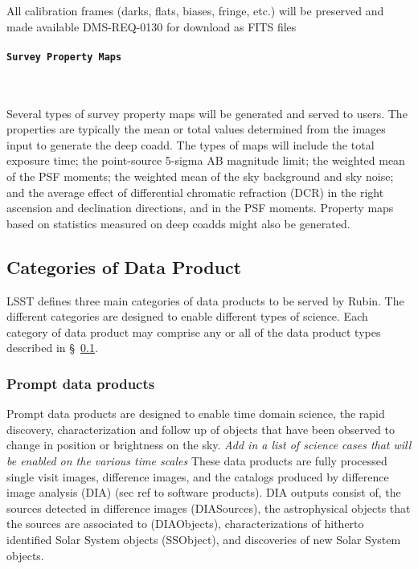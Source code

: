 All calibration frames (darks, flats, biases, fringe, etc.) will be preserved and made available DMS-REQ-0130
for download as FITS files

\paragraph {\tt  Survey Property Maps}~

Several types of survey property maps will be generated and served to users. 
The properties are typically the mean or total values determined from the images input to generate the deep coadd. 
The types of maps will include the total exposure time; the point-source 5-sigma AB magnitude limit; the weighted mean of the PSF moments; the weighted mean of the sky background and sky noise; and the average effect of differential chromatic refraction (DCR) in the
right ascension and declination directions, and in the PSF moments. 
Property maps based on statistics measured on deep coadds might also be generated.



\subsection{Categories of Data Product} \label{sec:dp-categories}
LSST defines three main categories of data products to be served by Rubin.
The different categories are designed to enable different types of science.
Each category of data product may comprise any or all of the data product types described in \S~\ref{sec:dp-categories}.

\subsubsection{Prompt data products} \label{sec:dp-prompt}
Prompt data products are designed to enable time domain science, the rapid discovery, characterization and follow up of objects that have been observed to change in position or brightness on the sky.
{\it Add in a list of science cases that will be enabled on the various time scales}
These data products are fully processed single visit images, difference images, and the catalogs produced by difference image analysis (DIA)  (sec ref to software products).
DIA outputs consist of,  the sources detected in difference images (DIASources), the astrophysical objects that the sources are associated to (DIAObjects),
characterizations of hitherto identified Solar System objects (SSObject), and discoveries of new Solar System objects.

